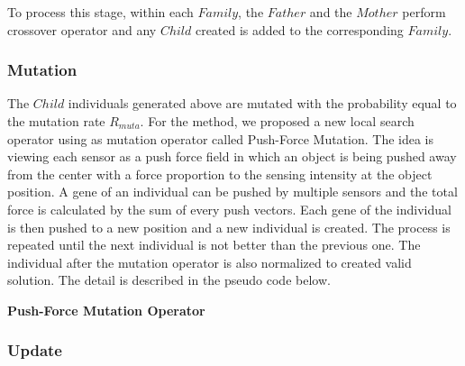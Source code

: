 \documentclass[final]{elsarticle}
\begin{document}
To process this stage, within each $ Family $, the $ Father $ and the $ Mother $ perform crossover operator and any $ Child $ created is added to the corresponding $ Family $.

\subsubsection{Mutation}

The $Child$ individuals generated above are mutated with the probability equal to the mutation rate $R_{muta}$. For the method, we proposed a new local search operator using as mutation operator called Push-Force Mutation. The idea is viewing each sensor as a push force field in which an object is being pushed away from the center with a force proportion to the sensing intensity at the object position. A gene of an individual can be pushed by multiple sensors and the total force is calculated by the sum of every push vectors. Each gene of the individual is then pushed to a new position and a new individual is created. The process is repeated until the next individual is not better than the previous one. The individual after the mutation operator is also normalized to created valid solution. The detail is described in the pseudo code below.
\begin{algorithm}[H]
	\SetAlgoLined
	\caption{\textbf{Push-Force Mutation Operator}} 
	\label{alg.3}
\end{algorithm} 

\subsubsection{Update}
\end{document}
